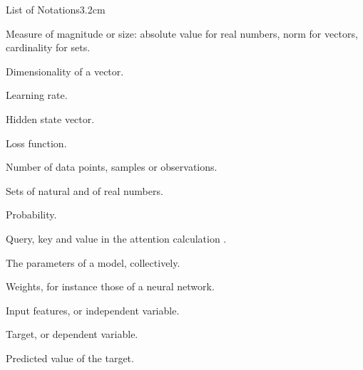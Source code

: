 %
%
%
\begin{mclistof}{List of Notations}{3.2cm}

    \item[$|\cdot|$] Measure of magnitude or size: absolute value for real numbers, norm for vectors, cardinality for sets.
    \item[$d$] Dimensionality of a vector.
    \item[$\eta$] Learning rate.
    \item[$\bm{h}$] Hidden state vector.
    \item[$\mathcal{L}$] Loss function.
    \item[$n$, $m$] Number of data points, samples or observations.
    \item[$\mathbb{N}$, $\mathbb{R}$] Sets of natural and of real numbers.
    \item[$p$] Probability.
    \item[$\bm{q}$, $\bm{k}$, $\bm{v}$] Query, key and value in the attention calculation \parencite{vaswani2017attention}.
    \item[$\bm{\theta}$] The parameters of a model, collectively.
    \item[$w$, $\bm{w}$, $\bm{W}$] Weights, for instance those of a neural network.
    \item[$x$, $\bm{x}$, $\bm{X}$] Input features, or independent variable.
    \item[$y$, $\bm{y}$, $\bm{Y}$] Target, or dependent variable.
    \item[$\hat{y}$, $\hat{\bm{y}}$] Predicted value of the target.

\end{mclistof}

